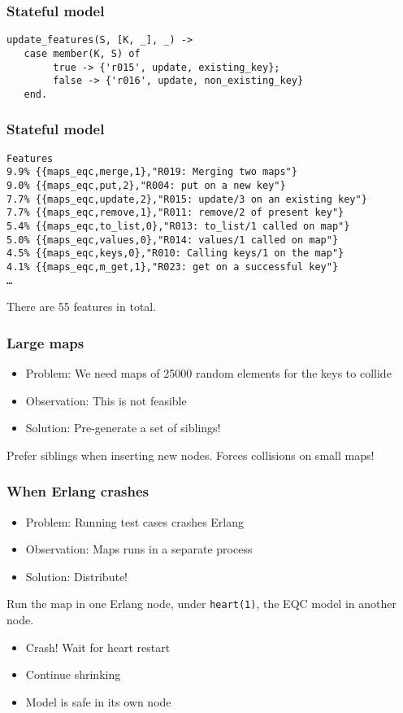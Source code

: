 \documentclass[lualatex]{beamer}
\begin{document}
\begin{frame}[fragile]
\frametitle{Stateful model}
\begin{verbatim}
update_features(S, [K, _], _) ->
   case member(K, S) of
        true -> {'r015', update, existing_key};
        false -> {'r016', update, non_existing_key}
   end.
\end{verbatim}
\end{frame}

\begin{frame}[fragile]
\frametitle{Stateful model}
{\small
\begin{verbatim}
Features
9.9% {{maps_eqc,merge,1},"R019: Merging two maps"}
9.0% {{maps_eqc,put,2},"R004: put on a new key"}
7.7% {{maps_eqc,update,2},"R015: update/3 on an existing key"}
7.7% {{maps_eqc,remove,1},"R011: remove/2 of present key"}
5.4% {{maps_eqc,to_list,0},"R013: to_list/1 called on map"}
5.0% {{maps_eqc,values,0},"R014: values/1 called on map"}
4.5% {{maps_eqc,keys,0},"R010: Calling keys/1 on the map"}
4.1% {{maps_eqc,m_get,1},"R023: get on a successful key"}
…
\end{verbatim}
}

There are 55 features in total.
\end{frame}

\begin{frame}
\frametitle{Large maps}

\begin{itemize}
\item Problem: We need maps of 25000 random elements for the keys to collide
\item Observation: This is not feasible
\item Solution: Pre-generate a set of siblings!
\end{itemize}

Prefer siblings when inserting new nodes. Forces collisions on small maps!

\end{frame}

\begin{frame}
\frametitle{When Erlang crashes}

\begin{itemize}
\item Problem: Running test cases crashes Erlang
\item Observation: Maps runs in a separate process
\item Solution: Distribute!
\end{itemize}

Run the map in one Erlang node, under \texttt{heart(1)}, the EQC model in another node.

\begin{itemize}
\item Crash! Wait for heart restart
\item Continue shrinking
\item Model is safe in its own node
\end{itemize}

\end{frame}
\end{document}
